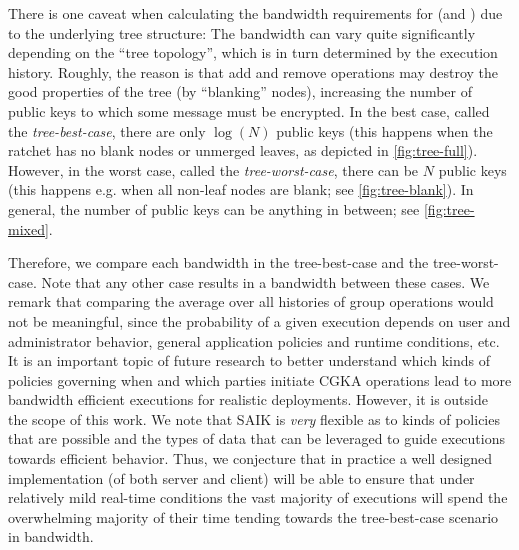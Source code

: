 There is one caveat when calculating the bandwidth requirements for \saik (and \protITK) due to the underlying tree structure: The bandwidth can vary quite
significantly depending on the ``tree topology'', which is in turn determined by the execution history. Roughly, the reason is that add and remove operations may destroy the
good properties of the tree (by ``blanking'' nodes), increasing the number of public keys to which some message must be encrypted. In the
best case, called the \emph{tree-best-case}, there are only $\log(N)$ public keys (this happens when the ratchet has no blank nodes or unmerged
leaves, as depicted in \cref{fig:tree-full}). However, in the worst case, called the \emph{tree-worst-case}, there can be
$N$ public keys (this happens e.g. when all non-leaf nodes are blank; see \cref{fig:tree-blank}). In general, the number of public keys can be anything in between; see \cref{fig:tree-mixed}.



Therefore, we compare each bandwidth in the tree-best-case and the tree-worst-case. Note that any other case results in a bandwidth between these cases.
We remark that comparing the average over all histories of group operations would not be meaningful, since the probability of a given execution depends on user and administrator behavior, general application policies and runtime conditions, etc.
It is an important topic of future research to
better understand which kinds of policies governing when and which parties
initiate CGKA operations lead to more bandwidth efficient executions for
realistic deployments. However, it is outside the scope of this work.
%
We note that SAIK is \emph{very} flexible as to kinds of policies that are possible and the types of data that can be leveraged to guide executions towards efficient behavior. Thus, we conjecture that in practice a well designed implementation (of both server and client) will be able to ensure that under relatively mild real-time conditions the vast majority of executions will spend the overwhelming majority of their time tending towards the tree-best-case scenario in bandwidth.


